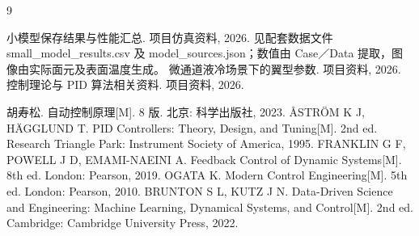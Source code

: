 \documentclass[stage2,fontset=fandol]{ydzjreport}
\begin{document}
\FloatBarrier
{}
\begin{thebibliography}{9}

 小模型保存结果与性能汇总. 项目仿真资料, 2026. 见配套数据文件 small\_model\_results.csv 及 model\_sources.json；数值由 Case／Data 提取，图像由实际面元及表面温度生成。
 微通道液冷场景下的翼型参数. 项目资料, 2026.
 控制理论与 PID 算法相关资料. 项目资料, 2026.

 胡寿松. 自动控制原理[M]. 8 版. 北京: 科学出版社, 2023.
 {\AA}STR{\"O}M K J, H{\"A}GGLUND T. PID Controllers: Theory, Design, and Tuning[M]. 2nd ed. Research Triangle Park: Instrument Society of America, 1995.
 FRANKLIN G F, POWELL J D, EMAMI-NAEINI A. Feedback Control of Dynamic Systems[M]. 8th ed. London: Pearson, 2019.
 OGATA K. Modern Control Engineering[M]. 5th ed. London: Pearson, 2010.
 BRUNTON S L, KUTZ J N. Data-Driven Science and Engineering: Machine Learning, Dynamical Systems, and Control[M]. 2nd ed. Cambridge: Cambridge University Press, 2022.
\end{thebibliography}
\end{document}
